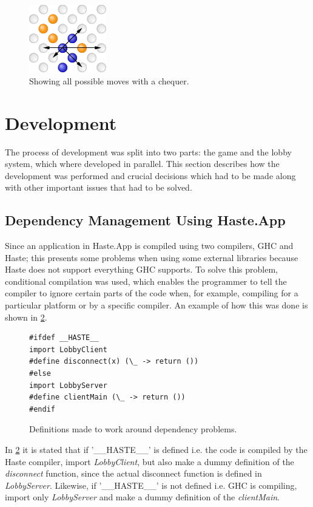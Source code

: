 \documentclass[a4paper]{article}
\begin{document}
\begin{figure}[h]
    \centering
    \includegraphics[width=0.3\textwidth]{figure/moves}
    \caption{Showing all possible moves with a chequer.}
    \label{fig:chequers-move}
\end{figure}

\section{Development}
The process of development was split into two parts: the game and the lobby system, which where developed in parallel. This section describes how the development was performed and crucial decisions which had to be made along with other important issues that had to be solved.

\subsection{Dependency Management Using Haste.App}
\label{sub:dependencies}
Since an application in Haste.App is compiled using two compilers, GHC and Haste; this presents some problems when using some external libraries because Haste does not support everything GHC supports. To solve this problem, conditional compilation was used, which enables the programmer to tell the compiler to ignore certain parts of the code when, for example, compiling for a particular platform or by a specific compiler. An example of how this was done is shown in \cref{fig:dependencies-definitions}.

\begin{figure}[h!]
\begin{lstlisting}
#ifdef __HASTE__
import LobbyClient
#define disconnect(x) (\_ -> return ())
#else
import LobbyServer
#define clientMain (\_ -> return ())
#endif
\end{lstlisting}
\caption{Definitions made to work around dependency problems.}
\label{fig:dependencies-definitions}
\end{figure}

In \cref{fig:dependencies-definitions} it is stated that if '\_\_HASTE\_\_' is defined i.e. the code is compiled by the Haste compiler, import \textit{LobbyClient}, but also make a dummy definition of the \textit{disconnect} function, since the actual disconnect function is defined in \textit{LobbyServer}. Likewise, if '\_\_HASTE\_\_' is not defined i.e. GHC is compiling, import only \textit{LobbyServer} and make a dummy definition of the \textit{clientMain}.
\end{document}
